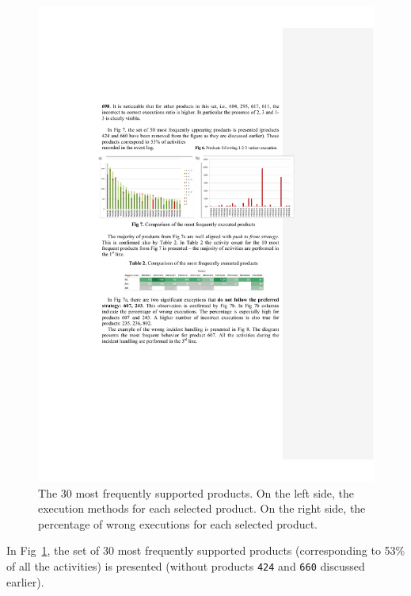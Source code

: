 \documentclass[lnbip]{svmultln}
\begin{document}
\begin{figure}
\centering
\includegraphics[width=\textwidth]{"figs/pic 9"}
\caption{The 30 most frequently supported products. On the left side, the execution methods for each selected product. On the right side, the percentage of wrong executions for each selected product.}
\label{fig:mostPopularProducts}
\end{figure}

In Fig~\ref{fig:mostPopularProducts}, the set of 30 most frequently supported products (corresponding to 53\% of all the activities) is presented (without products \texttt{424} and \texttt{660} discussed earlier).  
\end{document}

